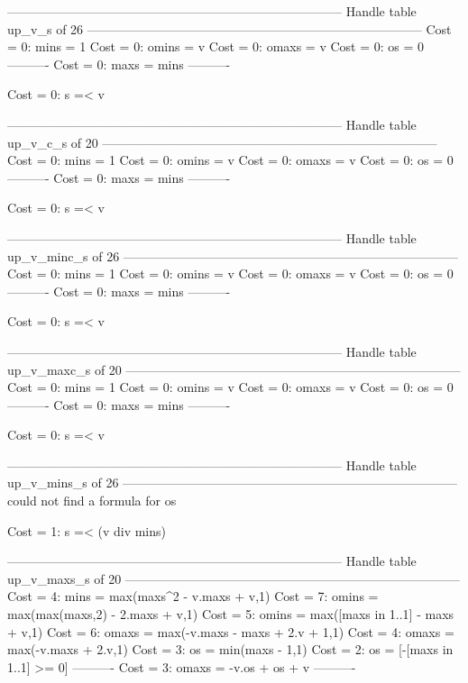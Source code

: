 --------------------------------------------------------------------------------
Handle table up_v_s of 26
--------------------------------------------------------------------------------
Cost =  0:  mins  = 1
Cost =  0:  omins = v
Cost =  0:  omaxs = v
Cost =  0:  os    = 0
----------
Cost =  0:  maxs  = mins
----------

Cost =  0:  s =< v

--------------------------------------------------------------------------------
Handle table up_v_c_s of 20
--------------------------------------------------------------------------------
Cost =  0:  mins  = 1
Cost =  0:  omins = v
Cost =  0:  omaxs = v
Cost =  0:  os    = 0
----------
Cost =  0:  maxs  = mins
----------

Cost =  0:  s =< v

--------------------------------------------------------------------------------
Handle table up_v_minc_s of 26
--------------------------------------------------------------------------------
Cost =  0:  mins  = 1
Cost =  0:  omins = v
Cost =  0:  omaxs = v
Cost =  0:  os    = 0
----------
Cost =  0:  maxs  = mins
----------

Cost =  0:  s =< v

--------------------------------------------------------------------------------
Handle table up_v_maxc_s of 20
--------------------------------------------------------------------------------
Cost =  0:  mins  = 1
Cost =  0:  omins = v
Cost =  0:  omaxs = v
Cost =  0:  os    = 0
----------
Cost =  0:  maxs  = mins
----------

Cost =  0:  s =< v

--------------------------------------------------------------------------------
Handle table up_v_mins_s of 26
--------------------------------------------------------------------------------
could not find a formula for os

Cost =  1:  s =< (v div mins)

--------------------------------------------------------------------------------
Handle table up_v_maxs_s of 20
--------------------------------------------------------------------------------
Cost =  4:  mins  = max(maxs^2 - v.maxs + v,1)
Cost =  7:  omins = max(max(maxs,2) - 2.maxs + v,1)
Cost =  5:  omins = max([maxs in 1..1] - maxs + v,1)
Cost =  6:  omaxs = max(-v.maxs - maxs + 2.v + 1,1)
Cost =  4:  omaxs = max(-v.maxs + 2.v,1)
Cost =  3:  os    = min(maxs - 1,1)
Cost =  2:  os    = [-[maxs in 1..1] >= 0]
----------
Cost =  3:  omaxs = -v.os + os + v
----------

